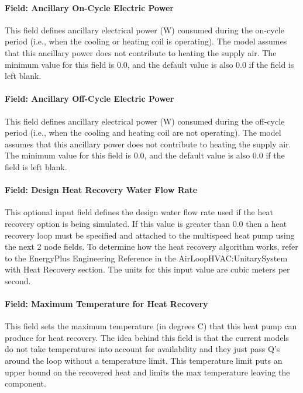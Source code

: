 \paragraph{Field: Ancillary On-Cycle Electric Power}\label{field-ancillary-on-cycle-electric-power}

This field defines ancillary electrical power (W) consumed during the on-cycle period (i.e., when the cooling or heating coil is operating). The model assumes that this ancillary power does not contribute to heating the supply air. The minimum value for this field is 0.0, and the default value is also 0.0 if the field is left blank.

\paragraph{Field: Ancillary Off-Cycle Electric Power}\label{field-ancillary-off-cycle-electric-power}

This field defines ancillary electrical power (W) consumed during the off-cycle period (i.e., when the cooling and heating coil are not operating). The model assumes that this ancillary power does not contribute to heating the supply air. The minimum value for this field is 0.0, and the default value is also 0.0 if the field is left blank.

\paragraph{Field: Design Heat Recovery Water Flow Rate}\label{field-design-heat-recovery-water-flow-rate-001}

This optional input field defines the design water flow rate used if the heat recovery option is being simulated. If this value is greater than 0.0 then a heat recovery loop must be specified and attached to the multispeed heat pump using the next 2 node fields. To determine how the heat recovery algorithm works, refer to the EnergyPlus Engineering Reference in the AirLoopHVAC:UnitarySystem with Heat Recovery section. The units for this input value are cubic meters per second.

\paragraph{Field: Maximum Temperature for Heat Recovery}\label{field-maximum-temperature-for-heat-recovery}

This field sets the maximum temperature (in degrees C) that this heat pump can produce for heat recovery. The idea behind this field is that the current models do not take temperatures into account for availability and they just pass Q's around the loop without a temperature limit. This temperature limit puts an upper bound on the recovered heat and limits the max temperature leaving the component.

